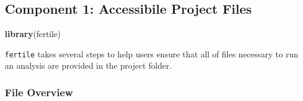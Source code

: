 \documentclass[12pt,twoside]{reedthesis}
\newenvironment{Shaded}{\begin{snugshade}}{\end{snugshade}}
\newcommand{\KeywordTok}[1]{\textcolor[rgb]{0.13,0.29,0.53}{\textbf{#1}}}
\newcommand{\NormalTok}[1]{#1}
\begin{document}
\subsection{Component 1: Accessibile Project
Files}\label{component-1-accessibile-project-files}
\begin{Shaded}
\begin{Highlighting}[]
\KeywordTok{library}\NormalTok{(fertile)}
\end{Highlighting}
\end{Shaded}
\texttt{fertile} takes several steps to help users ensure that all of
files necessary to run an analysis are provided in the project folder.

\subsubsection{File Overview}\label{file-overview}
\end{document}

